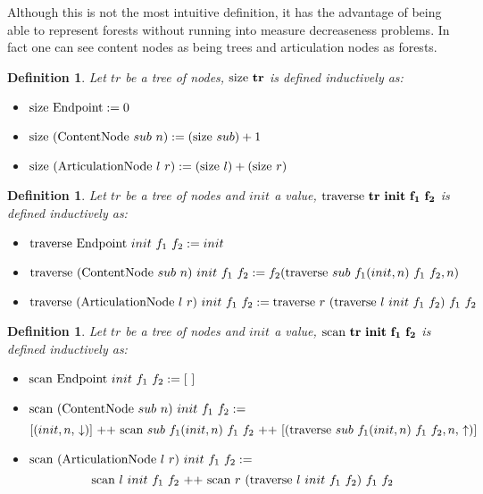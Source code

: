 \documentclass{article}
\newtheorem{definition}[lemma]{Definition}
\newcommand{\textfun}[1]{\textup{#1}}
\newcommand{\bolddef}[1]{\textbf{\ensuremath{\mathbf{#1}}}}
\newcommand{\fone}[2]{\ensuremath{f_{1}(#1, #2)}}
\newcommand{\ftwo}[2]{\ensuremath{f_{2}(#1, #2)}}
\newcommand{\emptyList}{\ensuremath{[\ ]}}
\newcommand{\concat}{{{\ ++\ }}}
\newcommand{\nilNode}{\textfun{Endpoint}}
\newcommand{\contentNode}[2]{\textfun{ContentNode}\ #1\ #2}
\newcommand{\artNode}[2]{\textfun{ArticulationNode}\ #1\ #2}
\newcommand{\longtraverse}[4]{\textfun{traverse}\ #1\ #2\ #3 \ #4}
\newcommand{\longscan}[4]{\textfun{scan}\ #1\ #2\ #3 \ #4}
\newcommand{\up}{\uparrow}
\newcommand{\down}{\downarrow}
\newcommand{\size}[1]{\textfun{size}\ #1}
\begin{document}
Although this is not the most intuitive definition, it has the advantage of being able to represent forests 
without running into measure decreaseness problems. In fact one can see content nodes as being trees and articulation nodes as forests.


\begin{definition}
    \label{size_def}
    Let $tr$ be a tree of nodes, \bolddef{\size{tr}} is defined inductively as:
    \begin{itemize}
        \item $\size{\nilNode} := 0$
        \item $\size{(\contentNode{sub}{n})} := (\size{sub}) + 1$
        \item $\size{(\artNode{l}{r})} := (\size{l}) + (\size{r})$
    \end{itemize}
\end{definition}

\begin{definition}
    \label{traverse_def}
    Let $tr$ be a tree of nodes and $init$ a value, \bolddef{\longtraverse{tr}{init}{f_1}{f_2}} is defined inductively as:
    \begin{itemize}
        \item $\longtraverse{\nilNode}{init}{f_1}{f_2} := init$
        \item $\longtraverse{(\contentNode{sub}{n})}{init}{f_1}{f_2} := \ftwo{\longtraverse{sub}{\fone{init}{n}}{f_1}{f_2}}{n}$
        \item $\longtraverse{(\artNode{l}{r})}{init}{f_1}{f_2} := \longtraverse{r}{(\longtraverse{l}{init}{f_1}{f_2})}{f_1}{f_2}$
    \end{itemize}
\end{definition}

\begin{definition}
    \label{scan_def}
    Let $tr$ be a tree of nodes and $init$ a value, \bolddef{\longscan{tr}{init}{f_1}{f_2}} is defined inductively as:
    \begin{itemize}
        \item $\longscan{\nilNode}{init}{f_1}{f_2} := \emptyList$
        \item $\longscan{(\contentNode{sub}{n})}{init}{f_1}{f_2} :=$
        \[ [(init, n,\,\down)] \concat \longscan{sub}{f_1(init, n)}{f_1}{f_2} \concat [(\longtraverse{sub}{f_1(init, n)}{f_1}{f_2}, n,\,\up)]\]
        \item $\longscan{(\artNode{l}{r})}{init}{f_1}{f_2} :=$
        \[\longscan{l}{init}{f_1}{f_2} \concat \longscan{r}{(\longtraverse{l}{init}{f_1}{f_2})}{f_1}{f_2}\]
    \end{itemize}
\end{definition}
\end{document}
